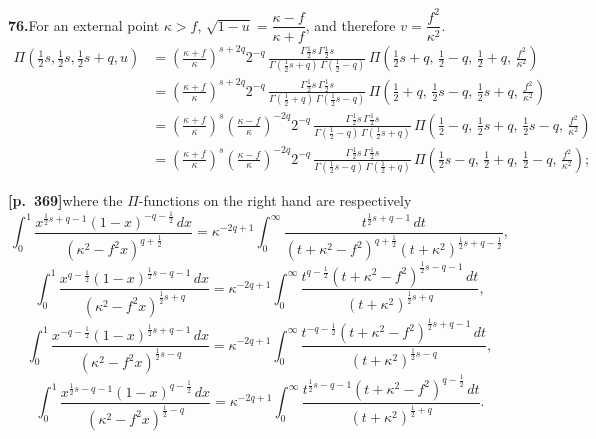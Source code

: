\documentclass[11pt]{article}
\begin{document}
\bigskip

\noindent\textbf{76.}\quad For an external point $\kappa>f$, $\sqrt{1-u} = \dfrac{\kappa-f}{\kappa+f}$, and therefore $v=\dfrac{f^{2}}{\kappa^{2}}$.
\begin{align*}
\Pi(\tfrac{1}{2}s,\tfrac{1}{2}s,\tfrac{1}{2}s+q,u)
&= \left(\frac{\kappa+f}{\kappa}\right)^{s+2q} 2^{-q}\,\frac{\Gamma\tfrac{1}{2}s\,\Gamma\tfrac{1}{2}s}{\Gamma(\tfrac{1}{2}s+q)\,\Gamma(\tfrac{1}{2}-q)}\,\Pi\!\left(\tfrac{1}{2}s+q,\,\tfrac{1}{2}-q,\,\tfrac{1}{2}+q,\,\tfrac{f^{2}}{\kappa^{2}}\right) \\[3pt]
&= \left(\frac{\kappa+f}{\kappa}\right)^{s+2q} 2^{-q}\,\frac{\Gamma\tfrac{1}{2}s\,\Gamma\tfrac{1}{2}s}{\Gamma(\tfrac{1}{2}+q)\,\Gamma(\tfrac{1}{2}s-q)}\,\Pi\!\left(\tfrac{1}{2}+q,\,\tfrac{1}{2}s-q,\,\tfrac{1}{2}s+q,\,\tfrac{f^{2}}{\kappa^{2}}\right) \\[3pt]
&= \left(\frac{\kappa+f}{\kappa}\right)^{s}\!\left(\frac{\kappa-f}{\kappa}\right)^{-2q} 2^{-q}\,\frac{\Gamma\tfrac{1}{2}s\,\Gamma\tfrac{1}{2}s}{\Gamma(\tfrac{1}{2}-q)\,\Gamma(\tfrac{1}{2}s+q)}\,\Pi\!\left(\tfrac{1}{2}-q,\,\tfrac{1}{2}s+q,\,\tfrac{1}{2}s-q,\,\tfrac{f^{2}}{\kappa^{2}}\right) \\[3pt]
&= \left(\frac{\kappa+f}{\kappa}\right)^{s}\!\left(\frac{\kappa-f}{\kappa}\right)^{-2q} 2^{-q}\,\frac{\Gamma\tfrac{1}{2}s\,\Gamma\tfrac{1}{2}s}{\Gamma(\tfrac{1}{2}s-q)\,\Gamma(\tfrac{1}{2}+q)}\,\Pi\!\left(\tfrac{1}{2}s-q,\,\tfrac{1}{2}+q,\,\tfrac{1}{2}-q,\,\tfrac{f^{2}}{\kappa^{2}}\right);
\end{align*}

\bigskip

\noindent\textbf{[p.~369]}\quad where the $\Pi$-functions on the right hand are respectively
\[
\int_{0}^{1}\frac{x^{\frac{1}{2}s+q-1}(1-x)^{-q-\frac{1}{2}}\,dx}{(\kappa^{2}-f^{2}x)^{q+\frac{1}{2}}}
= \kappa^{-2q+1}\int_{0}^{\infty}\frac{t^{\frac{1}{2}s+q-1}\,dt}{(t+\kappa^{2}-f^{2})^{q+\frac{1}{2}}(t+\kappa^{2})^{\frac{1}{2}s+q-\frac{1}{2}}},
\]
\[
\int_{0}^{1}\frac{x^{q-\frac{1}{2}}(1-x)^{\frac{1}{2}s-q-1}\,dx}{(\kappa^{2}-f^{2}x)^{\frac{1}{2}s+q}}
= \kappa^{-2q+1}\int_{0}^{\infty}\frac{t^{q-\frac{1}{2}}(t+\kappa^{2}-f^{2})^{\frac{1}{2}s-q-1}\,dt}{(t+\kappa^{2})^{\frac{1}{2}s+q}},
\]
\[
\int_{0}^{1}\frac{x^{-q-\frac{1}{2}}(1-x)^{\frac{1}{2}s+q-1}\,dx}{(\kappa^{2}-f^{2}x)^{\frac{1}{2}s-q}}
= \kappa^{-2q+1}\int_{0}^{\infty}\frac{t^{-q-\frac{1}{2}}(t+\kappa^{2}-f^{2})^{\frac{1}{2}s+q-1}\,dt}{(t+\kappa^{2})^{\frac{1}{2}s-q}},
\]
\[
\int_{0}^{1}\frac{x^{\frac{1}{2}s-q-1}(1-x)^{q-\frac{1}{2}}\,dx}{(\kappa^{2}-f^{2}x)^{\frac{1}{2}-q}}
= \kappa^{-2q+1}\int_{0}^{\infty}\frac{t^{\frac{1}{2}s-q-1}(t+\kappa^{2}-f^{2})^{q-\frac{1}{2}}\,dt}{(t+\kappa^{2})^{\frac{1}{2}+q}}.
\]
\end{document}

